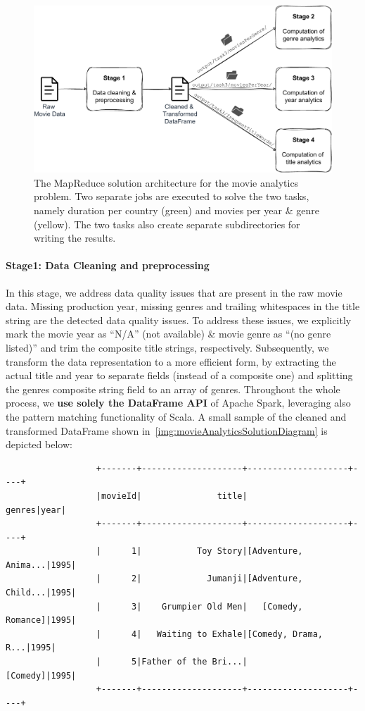 \documentclass[acmlarge]{acmart}
\begin{document}
  \begin{figure}[tb!]
    \centering
    \includegraphics[width=0.7\linewidth]{figures/movieAnalytics}
    \caption{The MapReduce solution architecture for the movie analytics problem. Two separate jobs are executed to solve the two tasks, namely duration per country (green) and movies per year \& genre (yellow). The two tasks also create separate subdirectories for writing the results.}
    \label{img:movieAnalyticsSolutionDiagram}
  \end{figure}

  \paragraph{Stage1: Data Cleaning and preprocessing} In this stage, we address data quality issues that are present in the raw movie data. Missing production year, missing genres and trailing whitespaces in the title string are the detected data quality issues. To address these issues, we explicitly mark the movie year as ``N/A'' (not available) \& movie genre as ``(no genre listed)'' and trim the composite title strings, respectively. Subsequently, we transform the data representation to a more efficient form, by extracting the actual title and year to separate fields (instead of a composite one) and splitting the genres composite string field to an array of genres. Throughout the whole process, we \textbf{use solely the DataFrame API} of Apache Spark, leveraging also the pattern matching functionality of Scala. A small sample of the cleaned and transformed DataFrame shown in~\autoref{img:movieAnalyticsSolutionDiagram} is depicted below:

  \begin{verbatim}
                  +-------+--------------------+--------------------+----+
                  |movieId|               title|              genres|year|
                  +-------+--------------------+--------------------+----+
                  |      1|           Toy Story|[Adventure, Anima...|1995|
                  |      2|             Jumanji|[Adventure, Child...|1995|
                  |      3|    Grumpier Old Men|   [Comedy, Romance]|1995|
                  |      4|   Waiting to Exhale|[Comedy, Drama, R...|1995|
                  |      5|Father of the Bri...|            [Comedy]|1995|
                  +-------+--------------------+--------------------+----+
  \end{verbatim}
\end{document}
